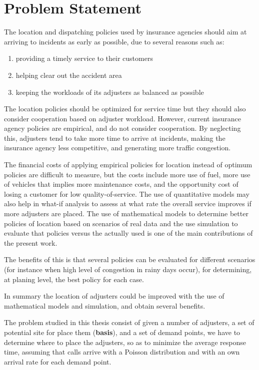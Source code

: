 \section{Problem Statement}

The location and dispatching policies
used by insurance agencies
should aim
at arriving to incidents
as early as possible,
due to several reasons
such as:
\begin{enumerate}
\item providing a timely service to their customers
\item helping clear out the accident area
\item keeping the workloads of its adjusters
  as balanced as possible
\end{enumerate}
The location policies
should be optimized for service time
but they should also consider
cooperation based on adjuster workload.
However,
current insurance agency policies
are empirical,
and do not consider cooperation.
By neglecting this,
adjusters tend to take
more time to arrive at incidents,
making the insurance agency
less competitive,
and generating more traffic congestion.

The financial costs
of applying
empirical policies for location
instead of optimum policies
are difficult to measure,
but the costs include
more use of fuel,
more use of vehicles
that implies
more maintenance costs,
and the opportunity cost
of losing a customer
for low quality-of-service.
The use of quantitative models
may also help
in what-if analysis
to assess at what rate
the overall service
improves if more adjusters are placed.
The use of mathematical models
to determine better policies of location
based on scenarios
of real data
and the use simulation
to evaluate that policies
versus the actually used
is one of the main contributions
of the present work.

The benefits of this
is that several policies
can be evaluated
for different scenarios
(for instance
when high level of congestion
in rainy days occur),
for determining,
at planing level,
the best policy
for each case.

In summary
the location of adjusters
could be improved
with the use of
mathematical models and simulation,
and obtain several benefits.

The problem studied in this thesis
consist of
given a number of adjusters,
a set of potential site for place them (\textbf{basis}),
and a set of demand points,
we have to determine
where to place the adjusters,
so as to minimize 
the average response time,
assuming
that calls
arrive with a Poisson distribution
and with an own arrival rate
for each demand point.
